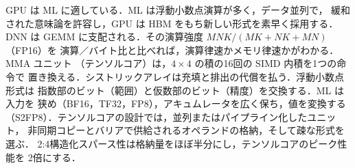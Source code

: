 \documentclass[../main.tex]{subfiles}
\begin{document}
\begin{keypoint}[章のまとめ]
  GPU は ML に適している．ML は浮動小数点演算が多く，データ並列で，
  緩和された意味論を許容し，GPU は HBM をもち新しい形式を素早く採用する．
  DNN は GEMM に支配される．その演算強度 $MNK/(MK + NK + MN)$（FP16）を
  演算／バイト比と比べれば，演算律速かメモリ律速かがわかる．MMA ユニット
  （テンソルコア）は，$4 \times 4$ の積の16回の SIMD 内積を1つの命令で
  置き換える．シストリックアレイは充填と排出の代償を払う．浮動小数点形式は
  指数部のビット（範囲）と仮数部のビット（精度）を交換する．ML は入力を
  狭め（BF16，TF32，FP8），アキュムレータを広く保ち，値を変換する
  （S2FP8）．テンソルコアの設計では，並列またはパイプライン化したユニット，
  非同期コピーとバリアで供給されるオペランドの格納，そして疎な形式を選ぶ．
  2:4構造化スパース性は格納量をほぼ半分にし，テンソルコアのピーク性能を
  2倍にする．
\end{keypoint}
\end{document}
